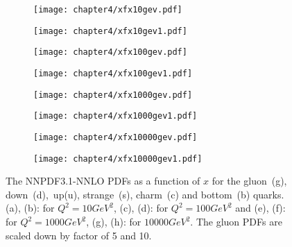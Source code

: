 \documentclass[a4paper,12pt]{report}
\numberwithin{equation}{section}
\begin{document}
\begin{figure}[H]
\centering
\begin{subfigure}{0.45\textwidth}
\texttt{[image: chapter4/xfx10gev.pdf]}
\vspace*{-8mm}
\caption{}
\end{subfigure}
\begin{subfigure}{0.45\textwidth}
\texttt{[image: chapter4/xfx10gev1.pdf]}
\vspace*{-8mm}
\caption{}
\end{subfigure}
\begin{subfigure}{0.45\textwidth}
\texttt{[image: chapter4/xfx100gev.pdf]}
\vspace*{-8mm}
\caption{}
\end{subfigure}
\begin{subfigure}{0.45\textwidth}
\texttt{[image: chapter4/xfx100gev1.pdf]}
\vspace*{-8mm}
\caption{}
\end{subfigure}
\begin{subfigure}{0.45\textwidth}
\texttt{[image: chapter4/xfx1000gev.pdf]}
\vspace*{-8mm}
\caption{}
\end{subfigure}
\begin{subfigure}{0.45\textwidth}
\texttt{[image: chapter4/xfx1000gev1.pdf]}
\vspace*{-8mm}
\caption{}
\end{subfigure}
\begin{subfigure}{0.45\textwidth}
\texttt{[image: chapter4/xfx10000gev.pdf]}
\vspace*{-8mm}
\caption{}
\end{subfigure}
\begin{subfigure}{0.45\textwidth}
\texttt{[image: chapter4/xfx10000gev1.pdf]}
\vspace*{-8mm}
\caption{}
\end{subfigure}
\caption{The NNPDF3.1-NNLO PDFs as a function of $x$ for the gluon~(g), down~(d),~up(u), strange~(s), charm~(c) and bottom~(b) quarks. (a), (b): for $Q^{2}= 10GeV^{2}$, (c), (d): for $Q^{2}=100GeV^{2}$ and (e), (f): for $Q^{2}=1000GeV^{2}$, (g), (h): for $10000GeV^{2}$. The gluon PDFs are scaled down by factor of 5 and 10.} 
\end{figure}
\end{document}

